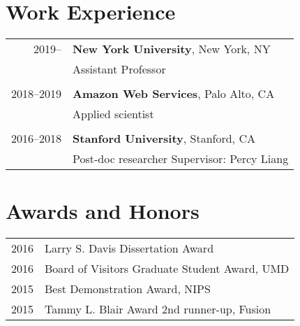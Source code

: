 \documentclass[a4paper,11pt]{article}
\begin{document}
\section{Work Experience}
\begin{tabular}{rl}    
2019--   & \textbf{New York University}, New York, NY \\
    & Assistant Professor \\
\\
2018--2019  & \textbf{Amazon Web Services}, Palo Alto, CA \\
    & Applied scientist \\
\\
2016--2018 & \textbf{Stanford University}, Stanford, CA\\
& Post-doc researcher \hspace{2em} Supervisor: Percy Liang \\
\end{tabular}

\section{Awards and Honors}
\begin{tabular}{rl}    
2016 & Larry S. Davis Dissertation Award\\
2016 & Board of Visitors Graduate Student Award, UMD\\
2015 & Best Demonstration Award, NIPS\\
2015 & Tammy L. Blair Award 2nd runner-up, Fusion\\
\end{tabular}
\end{document}
